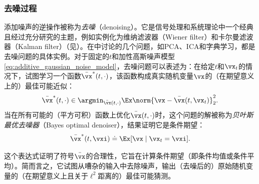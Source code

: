 \documentclass[../../book-main_zh.tex]{subfiles}
\begin{document}
\subsubsection{去噪过程}
添加噪声的逆操作被称为\textit{去噪}（denoising）。它是信号处理和系统理论中一个经典且经过充分研究的主题，例如实例化为维纳滤波器（Wiener filter）和卡尔曼滤波器（Kalman filter）（见）。在中讨论的几个问题，如PCA、ICA和字典学习，都是去噪问题的具体实例。对于固定的\(t\)和加性高斯噪声模型\eqref{eq:additive_gaussian_noise_model}，去噪问题可以表述为：在给定\(t\)和\(\vx_{t}\)的情况下，试图学习一个函数\(\bar{\vx}^{\ast}(t,
\cdot)\)，该函数构成真实随机变量\(\vx\)的（在期望意义上的）最佳可能近似：
\begin{equation}\label{eq:denoising_loss}
    \bar{\vx}^{\ast}(t, \cdot) \in \argmin_{\bar{\vx}(t,
    \cdot)}\Ex\norm{\vx - \bar{\vx}(t, \vx_{t})}_{2}^{2}.
\end{equation}
当在所有可能的（平方可积）函数上优化\(\bar{\vx}(t, \cdot)\)时，这个问题的解被称为\textit{贝叶斯最优去噪器}（Bayes optimal denoiser），结果证明它是条件期望：
\begin{equation}\label{eq:optimal_denoiser}
    \bar{\vx}^{\ast}(t, \vxi) \doteq \Ex[\vx \mid \vx_{t} = \vxi].
\end{equation}

这个表达式证明了符号\(\bar{\vx}\)的合理性，它旨在计算条件期望（即条件均值或条件平均）。简而言之，它试图从嘈杂的输入中去除噪声，输出（去噪后的）原始随机变量的（在期望意义上且关于\(\ell^{2}\)距离的）最佳可能猜测。
\end{document}

